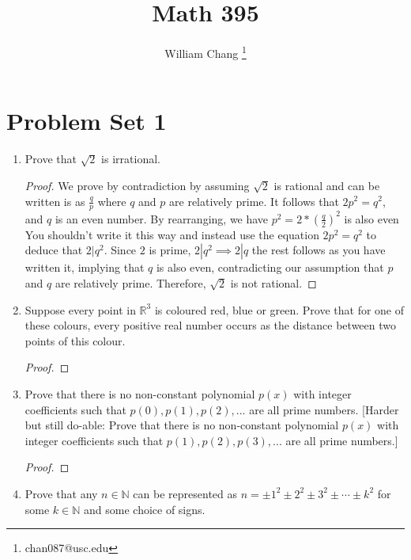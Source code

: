 \documentclass{article}
\title{Math 395}
\author{William Chang \footnote{chan087@usc.edu}}
\date{}
\newcommand{\blue}{\color{blue}}
\newcommand{\black}{\color{black}}
\begin{document}
\renewcommand{\baselinestretch}{1.5}
\setlength{\columnsep}{1in}
\maketitle
\tableofcontents
\newpage

\section{Problem Set 1}

\begin{enumerate}

\item Prove that $\sqrt{2}$ is irrational.

\begin{proof}
We prove by contradiction by assuming $\sqrt{2}$ is rational and can be written is as $\frac{q}{p}$ where $q$ and $p$ are relatively prime. It follows that $2p^2 = q^2$, and $q$ is an even number. By rearranging, we have $p^2 = 2*(\frac{q}{2})^2$ is also even \blue You shouldn't write it this way and instead use the equation $2p^2 = q^2$ to deduce that $2|q^2$. Since $2$ is prime, $2|q^2 \implies 2|q$ the rest follows as you have written it\black, implying that $q$ is also even, contradicting our assumption that $p$ and $q$ are relatively prime. Therefore, $\sqrt{2}$ is not rational.
\end{proof}

\item Suppose every point in $\mathbb{R}^3$ is coloured red, blue or green. Prove that for one
of these colours, every positive real number occurs as the distance between two points of this colour.

\begin{proof}

\end{proof}

\item Prove that there is no non-constant polynomial $p(x)$ with integer coefficients such
that $p(0), p(1), p(2),...$ are all prime numbers. [Harder but still do-able: Prove
that there is no non-constant polynomial $p(x)$ with integer coefficients such that
$p(1), p(2), p(3),...$ are all prime numbers.]

\begin{proof}

\end{proof}

\item Prove that any $n \in \mathbb{N}$ can be represented as $n = \pm 1^2 \pm 2^2 \pm 3^2 \pm \cdots \pm k^2$
for some $k \in \mathbb{N}$ and some choice of signs.


\end{enumerate}
\end{document}
